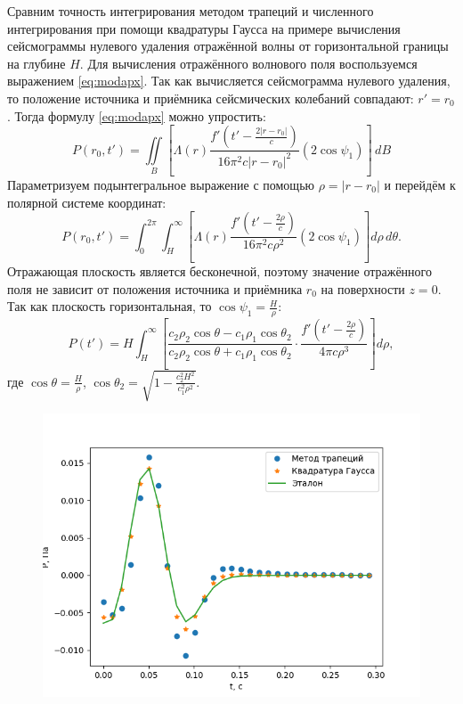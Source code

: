 \documentclass[a4paper, fontsize=14pt]{article}
\begin{document}
	Сравним точность интегрирования методом трапеций и численного интегрирования при помощи квадратуры Гаусса на примере вычисления сейсмограммы нулевого удаления отражённой волны от горизонтальной границы на глубине $H$.
	Для вычисления отражённого волнового поля воспользуемся выражением \eqref{eq:modapx}. Так как вычисляется сейсмограмма нулевого удаления, то положение источника и приёмника сейсмических колебаний совпадают: $r' = r_0$. Тогда формулу  \eqref{eq:modapx} можно упростить:
	\begin{equation}
		P(r_0,t') = \iint\limits_{B} \left[\Lambda(r) \frac{f'\left(t'-\frac{2|r-r_0|}{c}\right) }{16\pi^2c|r-r_0|^2} (2\cos \psi_1 ) \right] \,dB
	\end{equation}
	Параметризуем подынтегральное выражение с помощью $\rho = |r-r_0|$ и перейдём к полярной системе координат:
	\begin{equation}
		P(r_0,t') = \int_0^{2\pi}  \int_H^{\infty} \left[\Lambda(r) \frac{f'\left(t'-\frac{2\rho}{c}\right) }{16\pi^2c\rho^2} (2\cos \psi_1 ) \right] d\rho\,d\theta.
	\end{equation}
	Отражающая плоскость является бесконечной, поэтому значение отражённого поля не зависит от положения источника и приёмника $r_0$ на поверхности $z=0$.
	Так как плоскость горизонтальная, то $\cos \psi_1 = \frac{H}{\rho}$:
	\begin{equation}
		P(t') = H \int_H^{\infty} \left[ \frac{c_2 \rho_2 \cos \theta - c_1 \rho_1 \cos \theta_2}{c_2 \rho_2 \cos \theta + c_1 \rho_1 \cos \theta_2}  \cdot \frac{f'\left(t'-\frac{2\rho}{c}\right) }{4\pi c\rho^3}  \right] d\rho,
	\end{equation}
	где $\cos \theta = \frac{H}{\rho}$,  $\cos \theta_2 = \sqrt{1-\frac{c_2^2 H^2}{c_1^2\rho^2}}$.
	
	\begin{figure}[H]
		\centering
		\includegraphics[width=.8\textwidth]{trapgauss.png}
		\caption{}
		\label{fig:trapgauss}
	\end{figure}
	
\end{document}
